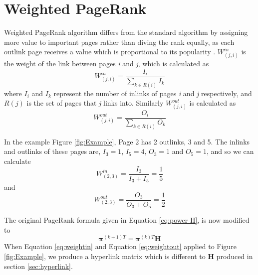 \section{Weighted PageRank}\label{sec:weighted}
Weighted PageRank algorithm differs from the standard algorithm by assigning more value to important pages rather than diving the rank equally, as each outlink page receives a value which is proportional to its popularity \cite{xing2004weighted}. $W^{in}_{(j,i)}$ is the weight of the link between pages \textit{i} and \textit{j}, which is calculated as 
\begin{equation}\label{eq:weightin}
W^{in}_{(j,i)} = \frac{I_i}{\sum_{k\in R(i)}I_k}
\end{equation}
where $I_i$ and $I_k$ represent the number of inlinks of pages \textit{i} and \textit{j} respectively, and $R(j)$ is the set of pages that \textit{j} links into. 
Similarly $W^{out}_{(j,i)}$ is calculated as
\begin{equation}\label{eq:weightout}
W^{out}_{(j,i)} = \frac{O_i}{\sum_{k\in R(i)}O_k}
\end{equation}

In the example Figure \ref{fig:Example}, Page 2 has 2 outlinks, 3 and 5. The inlinks and outlinks of these pages are, $I_3 = 1$, $I_5 = 4$, $O_3 = 1$ and $O_5 = 1$, and so we can calculate 
\[W^{in}_{(2,3)} = \frac{I_3}{I_3 + I_5} = \frac{1}{5} \]
and 
\[W^{out}_{(2,3)} = \frac{O_3}{O_3 + O_5} = \frac{1}{2} \] 

The original PageRank formula given in Equation \eqref{eq:power H}, is now modified to 
\begin{equation} \label{eq:WPR formula}
\boldsymbol\pi^{(k+1)T} = \boldsymbol\pi^{(k)T}\textbf{H}
\end{equation}
When Equation \eqref{eq:weightin} and Equation \eqref{eq:weightout} applied to Figure \ref{fig:Example}, we produce a hyperlink matrix which is different to \textbf{H} produced in section \ref{sec:hyperlink}. 

